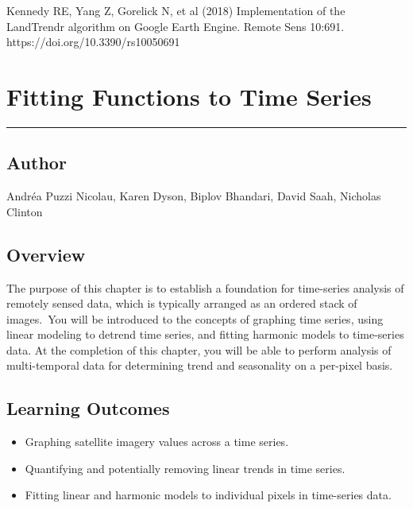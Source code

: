 \documentclass[
  letterpaper,
  DIV=11,
  numbers=noendperiod]{scrreprt}
\providecommand{\tightlist}{%
  \setlength{\itemsep}{0pt}\setlength{\parskip}{0pt}}\usepackage{longtable,booktabs,array}
\begin{document}
Kennedy RE, Yang Z, Gorelick N, et al (2018) Implementation of the
LandTrendr algorithm on Google Earth Engine. Remote Sens 10:691.
https://doi.org/10.3390/rs10050691

\hypertarget{fitting-functions-to-time-series}{%
\chapter{Fitting Functions to Time
Series}\label{fitting-functions-to-time-series}}

\begin{center}\rule{0.5\linewidth}{0.5pt}\end{center}

\hypertarget{author-11}{%
\section*{Author}\label{author-11}}


Andréa Puzzi Nicolau, Karen Dyson, Biplov Bhandari, David Saah, Nicholas
Clinton

\hypertarget{overview-13}{%
\section*{Overview}\label{overview-13}}


The purpose of this chapter is to establish a foundation for time-series
analysis of remotely sensed data, which is typically arranged as an
ordered stack of images.~You will be introduced to the concepts of
graphing time series, using linear modeling to detrend time series, and
fitting harmonic models to time-series data. At the completion of this
chapter, you will be able to perform analysis of multi-temporal data for
determining trend and seasonality on a per-pixel basis.

\hypertarget{learning-outcomes-13}{%
\section*{Learning Outcomes}\label{learning-outcomes-13}}


\begin{itemize}
\tightlist
\item
  Graphing satellite imagery values across a time series.
\item
  Quantifying and potentially removing linear trends in time series.
\item
  Fitting linear and harmonic models to individual pixels in time-series
  data.
\end{itemize}
\end{document}

